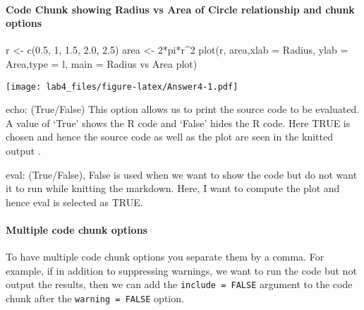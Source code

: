 \documentclass[
]{article}
\newenvironment{Shaded}{\begin{snugshade}}{\end{snugshade}}
\newcommand{\AttributeTok}[1]{\textcolor[rgb]{0.77,0.63,0.00}{#1}}
\newcommand{\DecValTok}[1]{\textcolor[rgb]{0.00,0.00,0.81}{#1}}
\newcommand{\FloatTok}[1]{\textcolor[rgb]{0.00,0.00,0.81}{#1}}
\newcommand{\FunctionTok}[1]{\textcolor[rgb]{0.00,0.00,0.00}{#1}}
\newcommand{\NormalTok}[1]{#1}
\newcommand{\OtherTok}[1]{\textcolor[rgb]{0.56,0.35,0.01}{#1}}
\newcommand{\SpecialCharTok}[1]{\textcolor[rgb]{0.00,0.00,0.00}{#1}}
\newcommand{\StringTok}[1]{\textcolor[rgb]{0.31,0.60,0.02}{#1}}
\begin{document}
\hypertarget{code-chunk-showing-radius-vs-area-of-circle-relationship-and-chunk-options}{%
\paragraph{Code Chunk showing Radius vs Area of Circle relationship and
chunk
options}\label{code-chunk-showing-radius-vs-area-of-circle-relationship-and-chunk-options}}

\begin{Shaded}
\begin{Highlighting}[]
\NormalTok{r }\OtherTok{\textless{}{-}} \FunctionTok{c}\NormalTok{(}\FloatTok{0.5}\NormalTok{, }\DecValTok{1}\NormalTok{, }\FloatTok{1.5}\NormalTok{, }\FloatTok{2.0}\NormalTok{, }\FloatTok{2.5}\NormalTok{)}
\NormalTok{area }\OtherTok{\textless{}{-}} \DecValTok{2}\SpecialCharTok{*}\NormalTok{pi}\SpecialCharTok{*}\NormalTok{r}\SpecialCharTok{\^{}}\DecValTok{2}
\FunctionTok{plot}\NormalTok{(r, area,}\AttributeTok{xlab =} \StringTok{\textquotesingle{}Radius\textquotesingle{}}\NormalTok{, }\AttributeTok{ylab =} \StringTok{\textquotesingle{}Area\textquotesingle{}}\NormalTok{,}\AttributeTok{type =} \StringTok{\textquotesingle{}l\textquotesingle{}}\NormalTok{, }\AttributeTok{main =} \StringTok{\textquotesingle{}Radius vs Area plot\textquotesingle{}}\NormalTok{)}
\end{Highlighting}
\end{Shaded}

\texttt{[image: lab4\_files/figure-latex/Answer4-1.pdf]}

echo: (True/False) This option allows us to print the source code to be
evaluated. A value of `True' shows the R code and `False' hides the R
code. Here TRUE is chosen and hence the source code as well as the plot
are seen in the knitted output .

eval: (True/False), False is used when we want to show the code but do
not want it to run while knitting the markdown. Here, I want to compute
the plot and hence eval is selected as TRUE.

\hypertarget{multiple-code-chunk-options}{%
\paragraph{Multiple code chunk
options}\label{multiple-code-chunk-options}}

To have multiple code chunk options you separate them by a comma. For
example, if in addition to suppressing warnings, we want to run the code
but not output the results, then we can add the
\texttt{include\ =\ FALSE} argument to the code chunk after the
\texttt{warning\ =\ FALSE} option.
\end{document}
